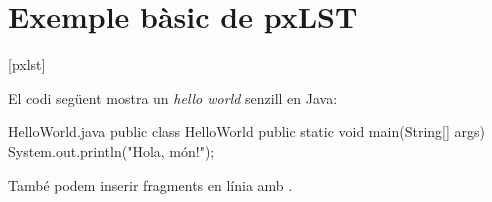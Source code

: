 \documentclass{P3CTeX}
\begin{document}
\section*{Exemple bàsic de pxLST}

[pxlst]

El codi següent mostra un \emph{hello world} senzill en Java:

\begin{pxCode}[language=pxJava]{HelloWorld.java}
public class HelloWorld {
  public static void main(String[] args) {
    System.out.println("Hola, món!");
  }
}
\end{pxCode}

També podem inserir fragments en línia amb .
\end{document}
